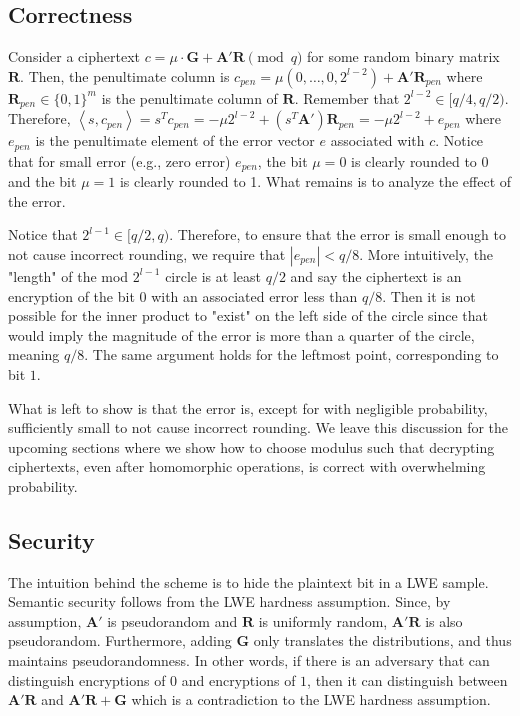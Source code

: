 \subsection*{Correctness}
Consider a ciphertext $c = \mu \cdot \mathbf{G} + \mathbf{A}'\mathbf{R} \pmod q$ for some random binary matrix $\mathbf{R}$. Then, the penultimate column is $c_{pen} = \mu (0, \dots, 0, 2^{l-2}) + \mathbf{A}' \mathbf{R}_{pen}$ where $\mathbf{R}_{pen} \in \{0,1\}^{m}$ is the penultimate column of $\mathbf{R}$. Remember that $2^{l-2} \in [q/4, q/2)$. Therefore, $\left \langle s, c_{pen} \right \rangle = s^Tc_{pen} = - \mu 2^{l-2} + (s^T \mathbf{A}') \mathbf{R}_{pen} = - \mu 2^{l-2} + e_{pen}$ where $e_{pen}$ is the penultimate element of the error vector $e$ associated with $c$. Notice that for small error (e.g., zero error) $e_{pen}$, the bit $\mu = 0$ is clearly rounded to 0 and the bit $\mu = 1$ is clearly rounded to 1. What remains is to analyze the effect of the error.

Notice that $2^{l-1} \in [q/2, q)$. Therefore, to ensure that the error is small enough to not cause incorrect rounding, we require that $|e_{pen}| < q/8$. More intuitively, the "length" of the mod $2^{l-1}$ circle is at least $q/2$ and say the ciphertext is an encryption of the bit $0$ with an associated error less than $q/8$. Then it is not possible for the inner product to "exist" on the left side of the circle since that would imply the magnitude of the error is more than a quarter of the circle, meaning $q/8$. The same argument holds for the leftmost point, corresponding to bit $1$.

What is left to show is that the error is, except for with negligible probability, sufficiently small to not cause incorrect rounding. We leave this discussion for the upcoming sections where we show how to choose modulus such that decrypting ciphertexts, even after homomorphic operations, is correct with overwhelming probability. 

\subsection*{Security}
The intuition behind the scheme is to hide the plaintext bit in a LWE sample. Semantic security follows from the LWE hardness assumption. Since, by assumption, $\mathbf{A}'$ is pseudorandom and $\mathbf{R}$ is uniformly random, $\mathbf{A}'\mathbf{R}$ is also pseudorandom. Furthermore, adding $\mathbf{G}$ only translates the distributions, and thus maintains pseudorandomness. In other words, if there is an adversary that can distinguish encryptions of $0$ and encryptions of $1$, then it can distinguish between $\mathbf{A}'\mathbf{R}$ and $\mathbf{A}'\mathbf{R} + \mathbf{G}$ which is a contradiction to the LWE hardness assumption. 

